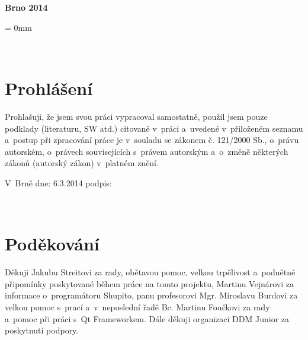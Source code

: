 \documentclass[12pt, a4paper, oneside]{article}
\newcommand{\B}{\textbf} %
\begin{document}
\vspace{20mm}

\begin{center}
\B{Brno 2014}

\end{center}
\normalsize
\newpage  %
\voffset = 0mm %

~ %

\vspace{10mm}

\section*{Prohlášení}

Prohlašuji, že jsem svou práci vypracoval samostatně, použil jsem pouze podklady (literaturu, SW atd.) citované v~práci a~uvedené v~přiloženém seznamu a~postup při zpracování práce je v~souladu se zákonem č. 121/2000 Sb., o~právu autorském, o~právech souvisejících s~právem autorským a~o~změně některých zákonů (autorský zákon) v~platném znění. 
 
\vspace{20mm} 
 
\noindent V~Brně  dne: 6.3.2014 \hspace{50mm}                 podpis:   
 

\newpage   %

~ %
\vspace{100mm}

\section*{Poděkování}
Děkuji Jakubu Streitovi za rady, obětavou pomoc, velkou trpělivost a~podnětné připomínky poskytované během práce na tomto projektu, Martinu Vejnárovi za informace o~programátoru Shupito, panu profesorovi Mgr. Miroslavu Burdovi za velkou pomoc s~prací a~v~neposlední řadě Bc. Martinu Foučkovi za rady a~pomoc při práci s~Qt Frameworkem. Dále děkuji organizaci DDM Junior za poskytnutí podpory.
 

\newpage   %
~ %
\vspace{-20mm}
\end{document}

